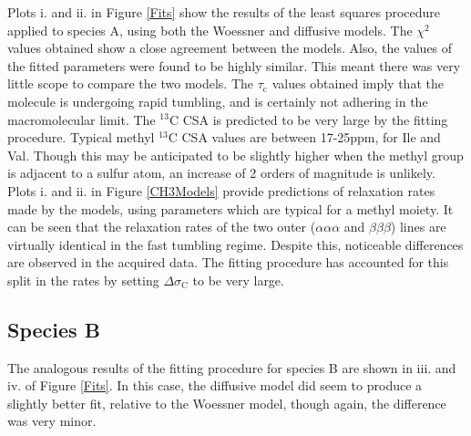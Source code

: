 Plots i. and ii. in Figure \ref{Fits} show the results of the least squares procedure applied to species A, using both the Woessner and diffusive models. The $\chi^2$ values obtained show a close agreement between the models. Also, the values of the fitted parameters were found to be highly similar. This meant there was very little scope to compare the two models. The $\tau_{\text{{c}}}$ values obtained imply that the molecule is undergoing rapid tumbling, and is certainly not adhering in the macromolecular limit. The $^{13}$C CSA is predicted to be very large by the fitting procedure. Typical methyl $^{13}$C CSA values are between 17-25ppm, for Ile and Val\cite{RN50}. Though this may be anticipated to be slightly higher when the methyl group is adjacent to a sulfur atom, an increase of 2 orders of magnitude is unlikely.  Plots i. and ii. in Figure \ref{CH3Models} provide predictions of relaxation rates made by the models, using parameters which are typical for a methyl moiety. It can be seen that the relaxation rates of the two outer ($\alpha \alpha \alpha$ and $\beta \beta \beta$) lines are virtually identical in the fast tumbling regime. Despite this, noticeable differences are observed in the acquired data. The fitting procedure has accounted for this split in the rates by setting $\Delta \sigma_{\text{C}}$ to be very large.
\subsection{Species B}
The analogous results of the fitting procedure for species B are shown in iii. and iv. of Figure \ref{Fits}. In this case, the diffusive model did seem to produce a slightly better fit, relative to the Woessner model, though again, the difference was very minor.
